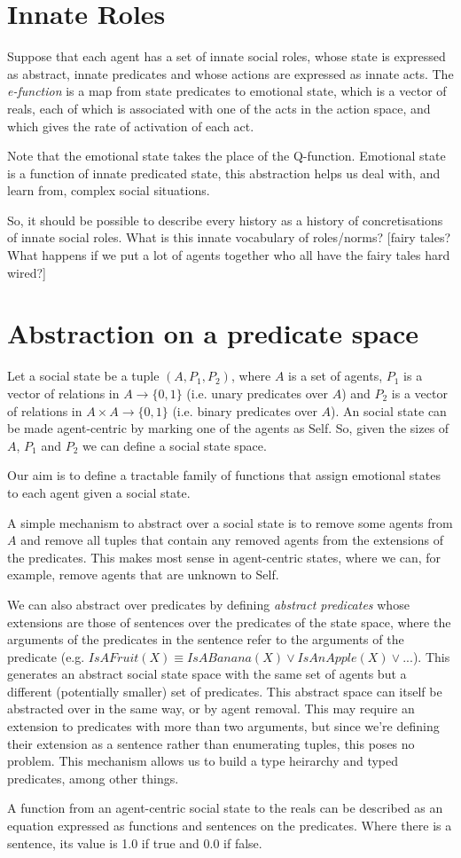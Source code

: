\documentclass[a4paper]{article}
\begin{document}
\section{Innate Roles}

Suppose that each agent has a set of innate social roles, whose state is expressed as abstract, innate predicates and whose actions are expressed as innate acts. The \textit{e-function} is a map from state predicates to emotional state, which is a vector of reals, each of which is associated with one of the acts in the action space, and which gives the rate of activation of each act.

Note that the emotional state takes the place of the Q-function. Emotional state is a function of innate predicated state, this abstraction helps us deal with, and learn from, complex social situations.
 
So, it should be possible to describe every history as a history of concretisations of innate social roles. What is this innate vocabulary of roles/norms? [fairy tales? What happens if we put a lot of agents together who all have the fairy tales hard wired?]

\section{Abstraction on a predicate space}

Let a social state be a tuple $(A, P_1, P_2)$, where $A$ is a set of agents, $P_1$ is a vector of relations in $A \to \{0,1\}$ (i.e. unary predicates over $A$) and $P_2$ is a vector of relations in $A \times A \to \{0,1\}$ (i.e. binary predicates over $A$). An social state can be made agent-centric by marking one of the agents as Self. So, given the sizes of $A$, $P_1$ and $P_2$ we can define a social state space.

Our aim is to define a tractable family of functions that assign emotional states to each agent given a social state.

A simple mechanism to abstract over a social state is to remove some agents from $A$ and remove all tuples that contain any removed agents from the extensions of the predicates. This makes most sense in agent-centric states, where we can, for example, remove agents that are unknown to Self.

We can also abstract over predicates by defining \textit{abstract predicates} whose extensions are those of sentences over the predicates of the state space, where the arguments of the predicates in the sentence refer to the arguments of the predicate (e.g. $IsAFruit(X) \equiv IsABanana(X) \vee IsAnApple(X) \vee ...$). This generates an abstract social state space with the same set of agents but a different (potentially smaller) set of predicates. This abstract space can itself be abstracted over in the same way, or by agent removal. This may require an extension to predicates with more than two arguments, but since we're defining their extension as a sentence rather than enumerating tuples, this poses no problem. This mechanism allows us to build a type heirarchy and typed predicates, among other things.

A function from an agent-centric social state to the reals can be described as an equation expressed as functions and sentences on the predicates. Where there is a sentence, its value is 1.0 if true and 0.0 if false.
\end{document}
